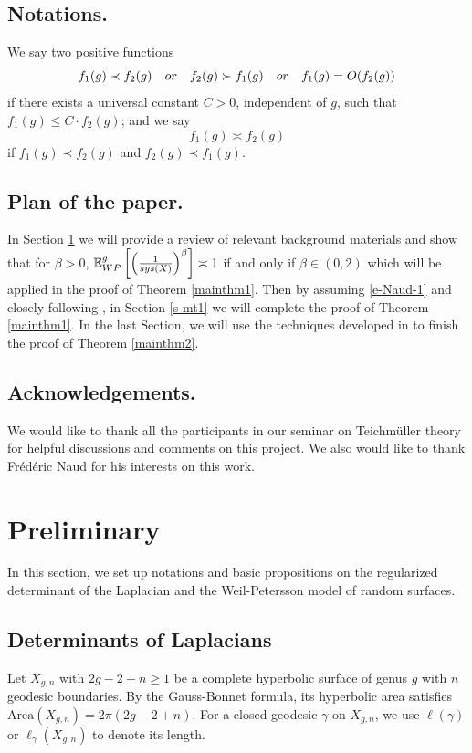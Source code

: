 \documentclass[11pt]{amsart}
\newcommand{\E}{\mathbb{E}_{\rm WP}^g}
\def\sys{\mathop{\rm sys}}
\theoremstyle{plain}
\theoremstyle{definition}
\theoremstyle{remark}
\begin{document}
\subsection*{Notations.} We say two positive functions $$f_1(g)\prec f_2(g)\quad \emph{or} \quad f_2(g)\succ f_1(g) \quad \emph{or} \quad f_1(g)=O(f_2(g))$$ if there exists a universal constant $C>0$, independent of $g$, such that $f_1(g) \leq C \cdot f_2(g)$; and we say $$f_1(g) \asymp f_2(g)$$ if $f_1(g)\prec f_2(g)$ and $f_2(g)\prec f_1(g)$. 


\subsection*{Plan of the paper.} In Section \ref{s-pre} we will provide a review of relevant background materials and show that for $\beta>0$, $\E\left[ 
  \left( \frac{1}{\sys(X)} \right)^\beta\right]\asymp 1$ if and only if $\beta\in (0,2)$ which will be applied in the proof of Theorem \ref{mainthm1}. Then by assuming \eqref{e-Naud-1} and closely following \cite{naud2023determinants}, in Section \ref{s-mt1} we will complete the proof of Theorem \ref{mainthm1}. In the last Section, we will use the techniques developed in \cite{nie2023large,wu2022random} to finish the proof of Theorem \ref{mainthm2}.

\subsection*{Acknowledgements.}
We would like to thank all the participants in our seminar on Teichm\"uller theory for helpful discussions and comments on this project. We also would like to thank Fr\'ed\'eric Naud for his interests on this work. 


 
\section{Preliminary}\label{s-pre}
In this section, we set up notations and basic propositions on the regularized determinant of the Laplacian and the Weil-Petersson model of random surfaces.
\subsection{Determinants of Laplacians}
 Let $X_{g,n}$ with $2g-2+n\geq 1$ be a complete hyperbolic surface of genus $g$ with $n$ geodesic boundaries. By the Gauss-Bonnet formula, its hyperbolic area satisfies $\mathrm{Area}(X_{g,n})=2\pi(2g-2+n)$.  For a closed geodesic $\gamma$ on $X_{g,n}$, we use $\ell(\gamma)$ or $\ell_\gamma(X_{g,n})$ to denote its length. 
\end{document}

